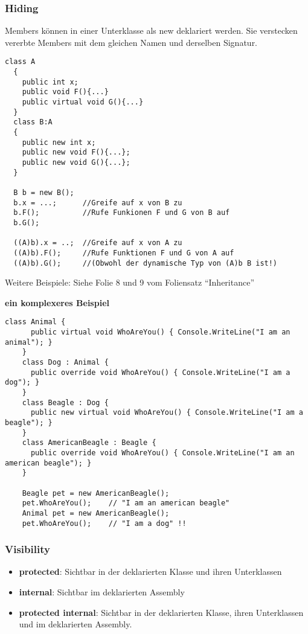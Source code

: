 \subsubsection{Hiding}
Members können in einer Unterklasse als new deklariert werden. Sie verstecken
vererbte Members mit dem gleichen Namen und derselben Signatur. 
\begin{lstlisting}[style=Csharp]
  class A
  {
    public int x; 
    public void F(){...}
    public virtual void G(){...}
  }
  class B:A
  {
    public new int x; 
    public new void F(){...};
    public new void G(){...};
  }
  
  B b = new B(); 
  b.x = ...;      //Greife auf x von B zu 
  b.F();          //Rufe Funkionen F und G von B auf
  b.G(); 
  
  ((A)b).x = ..;  //Greife auf x von A zu
  ((A)b).F();     //Rufe Funktionen F und G von A auf
  ((A)b).G();     //(Obwohl der dynamische Typ von (A)b B ist!)
\end{lstlisting}
Weitere Beispiele: Siehe Folie 8 und 9 vom Foliensatz "`Inheritance"'

\textbf{ein komplexeres Beispiel}
\begin{lstlisting}[style=Csharp]
	class Animal {
	  public virtual void WhoAreYou() { Console.WriteLine("I am an animal"); }
	}
	class Dog : Animal {
	  public override void WhoAreYou() { Console.WriteLine("I am a dog"); }
	}
	class Beagle : Dog {
	  public new virtual void WhoAreYou() { Console.WriteLine("I am a beagle"); }
	}
	class AmericanBeagle : Beagle {
	  public override void WhoAreYou() { Console.WriteLine("I am an american beagle"); }
	}
	
	Beagle pet = new AmericanBeagle();
	pet.WhoAreYou();	// "I am an american beagle"
	Animal pet = new AmericanBeagle();
	pet.WhoAreYou(); 	// "I am a dog" !!
\end{lstlisting}



\subsubsection{Visibility}
\begin{itemize}
  \item \textbf{protected}: Sichtbar in der deklarierten Klasse und ihren
  Unterklassen
  \item \textbf{internal}: Sichtbar im deklarierten Assembly
  \item \textbf{protected internal}: Sichtbar in der deklarierten Klasse, ihren
  Unterklassen und im deklarierten Assembly. 
\end{itemize}


